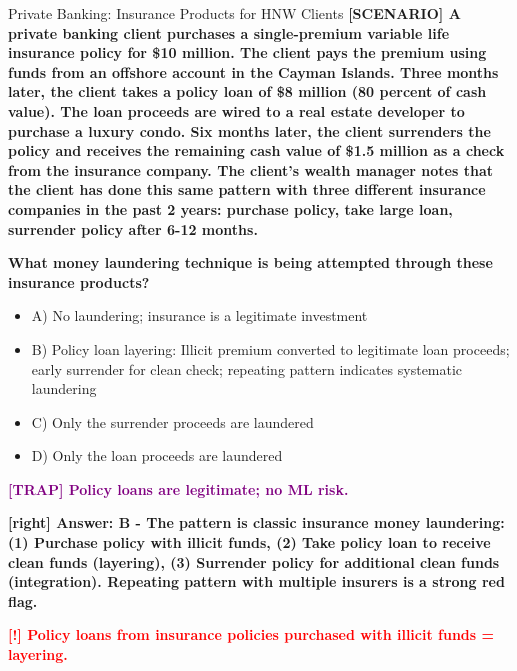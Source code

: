 \documentclass[11pt,a4paper]{beamer}
\newcommand{\redflag}[1]{\textcolor{red}{\textbf{[!] #1}}}
\newcommand{\trap}[1]{\textcolor{purple}{\textbf{[TRAP] #1}}}
\newcommand{\correct}[1]{\textcolor{green!50!black}{\textbf{[right] #1}}}
\newcommand{\scenario}[1]{\textcolor{blue!70!black}{\textbf{[SCENARIO] #1}}}
\begin{document}
	
	\begin{frame}{Private Banking: Insurance Products for HNW Clients}
		\tiny
		\scenario{A private banking client purchases a single-premium variable life insurance policy for \$10 million. The client pays the premium using funds from an offshore account in the Cayman Islands. Three months later, the client takes a policy loan of \$8 million (80 percent of cash value). The loan proceeds are wired to a real estate developer to purchase a luxury condo. Six months later, the client surrenders the policy and receives the remaining cash value of \$1.5 million as a check from the insurance company. The client's wealth manager notes that the client has done this same pattern with three different insurance companies in the past 2 years: purchase policy, take large loan, surrender policy after 6-12 months.}
		
		\vspace{0.02cm}
		\textbf{What money laundering technique is being attempted through these insurance products?}
		\vspace{0.02cm}
		
		\begin{itemize}
			\item A) No laundering; insurance is a legitimate investment
			\item B) Policy loan layering: Illicit premium converted to legitimate loan proceeds; early surrender for clean check; repeating pattern indicates systematic laundering
			\item C) Only the surrender proceeds are laundered
			\item D) Only the loan proceeds are laundered
		\end{itemize}
		
		\vspace{0.02cm}
		\trap{Policy loans are legitimate; no ML risk.}
		
		\vspace{0.02cm}
		\correct{Answer: B - The pattern is classic insurance money laundering: (1) Purchase policy with illicit funds, (2) Take policy loan to receive clean funds (layering), (3) Surrender policy for additional clean funds (integration). Repeating pattern with multiple insurers is a strong red flag.}
		
		\vspace{0.02cm}
		\redflag{Policy loans from insurance policies purchased with illicit funds = layering.}
	\end{frame}
	
\end{document}
